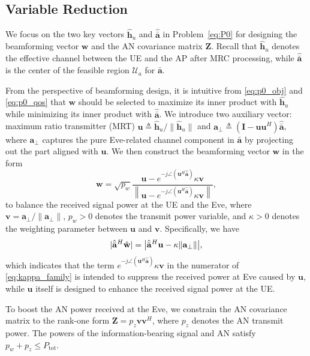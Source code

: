 \documentclass[journal]{IEEEtran}
\begin{document}
\subsection{Variable Reduction}
We focus on the two key vectors $\hat{\mathbf{h}}_u$ and $\hat{\bar{\mathbf{a}}}$ in Problem~\eqref{eq:P0} for designing the beamforming vector $\mathbf{w}$ and the AN covariance matrix $\mathbf{Z}$. Recall that $\hat{\mathbf{h}}_u$ denotes the effective channel between the UE and the AP after MRC processing, while $\hat{\bar{\mathbf{a}}}$ is the center of the feasible region $\mathcal{U}_a$ for $\bar{\mathbf{a}}$.

From the perspective of beamforming design, it is intuitive from \eqref{eq:p0_obj} and \eqref{eq:p0_qos} that $\mathbf{w}$ should be selected to maximize its inner product with $\hat{\mathbf{h}}_u$ while minimizing its inner product with $\hat{\bar{\mathbf{a}}}$. We introduce two auxiliary vector: maximum ratio transmitter (MRT) $\mathbf{u}\triangleq\hat{\mathbf{h}}_u/\|\hat{\mathbf{h}}_u\|$ and $\mathbf{a}_\perp\triangleq(\mathbf{I}-\mathbf{u}\mathbf{u}^H)\hat{\bar{\mathbf{a}}}$, where $\mathbf{a}_\perp$ captures the pure Eve-related channel component in $\bar{\mathbf{a}}$ by projecting out the part aligned with $\mathbf{u}$. We then construct the beamforming vector ${\mathbf{w}}$ in the form
\begin{equation}
{\mathbf{w}} =\sqrt{p_w}
\frac{\mathbf{u}-e^{-j\angle(\mathbf{u}^H\hat{\bar{\mathbf{a}}})}\kappa\mathbf{v}}
{\left\|\mathbf{u}-e^{-j\angle(\mathbf{u}^H\hat{\bar{\mathbf{a}}})}\kappa\mathbf{v}\right\|},
\label{eq:kappa_family}
\end{equation}
to balance the received signal power at the UE and the Eve, where $\mathbf{v}=\mathbf{a}_\perp/\|\mathbf{a}_\perp\|$, $p_w>0$ denotes the transmit power variable, and $\kappa>0$ denotes the weighting parameter between $\mathbf{u}$ and $\mathbf{v}$. Specifically, we have
\begin{align}
|\hat{\bar{\mathbf{a}}}^H \hat{\mathbf{w}}|=\big| \hat{\bar{\mathbf{a}}}^H\mathbf{u}-\kappa \|\mathbf{a}_\perp\| \big|,
\notag
\end{align}
which indicates that the term $e^{-j\angle(\mathbf{u}^H\hat{\bar{\mathbf{a}}})}\kappa\mathbf{v}$ in the numerator of \eqref{eq:kappa_family} is intended to suppress the received power at Eve caused by $\mathbf{u}$, while $\mathbf{u}$ itself is designed to enhance the received signal power at the UE.

To boost the AN power received at the Eve, we constrain the AN covariance matrix to the rank-one form $\mathbf{Z}=p_z\mathbf{v}\mathbf{v}^H$, where $p_z$ denotes the AN transmit power. The powers of the information-bearing signal and AN satisfy $p_w+p_z\le P_{\mathrm{tot}}$.
\end{document}
